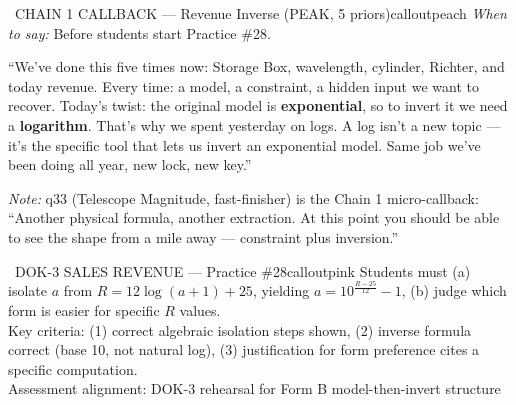 \documentclass[11pt]{article}
\begin{document}
\begin{callout}{\IconSpeak\ CHAIN 1 CALLBACK --- Revenue Inverse (PEAK, 5 priors)}{calloutpeach}
\textit{When to say:} Before students start Practice \#28.

\smallskip
``We've done this five times now: Storage Box, wavelength, cylinder, Richter, and today revenue. Every time: a model, a constraint, a hidden input we want to recover. Today's twist: the original model is \textbf{exponential}, so to invert it we need a \textbf{logarithm}. That's why we spent yesterday on logs. A log isn't a new topic --- it's the specific tool that lets us invert an exponential model. Same job we've been doing all year, new lock, new key.''

\smallskip
\textit{Note:} q33 (Telescope Magnitude, fast-finisher) is the Chain 1 micro-callback: ``Another physical formula, another extraction. At this point you should be able to see the shape from a mile away --- constraint plus inversion.''
\end{callout}


\begin{callout}{\IconStar\ DOK-3 SALES REVENUE --- Practice \#28}{calloutpink}
Students must (a) isolate \(a\) from \(R = 12\log(a+1)+25\), yielding \(a = 10^{\frac{R-25}{12}} - 1\), (b) judge which form is easier for specific \(R\) values.\\
Key criteria: (1) correct algebraic isolation steps shown, (2) inverse formula correct (base 10, not natural log), (3) justification for form preference cites a specific computation.\\
Assessment alignment: DOK-3 rehearsal for Form B model-then-invert structure
\end{callout}
\end{document}
